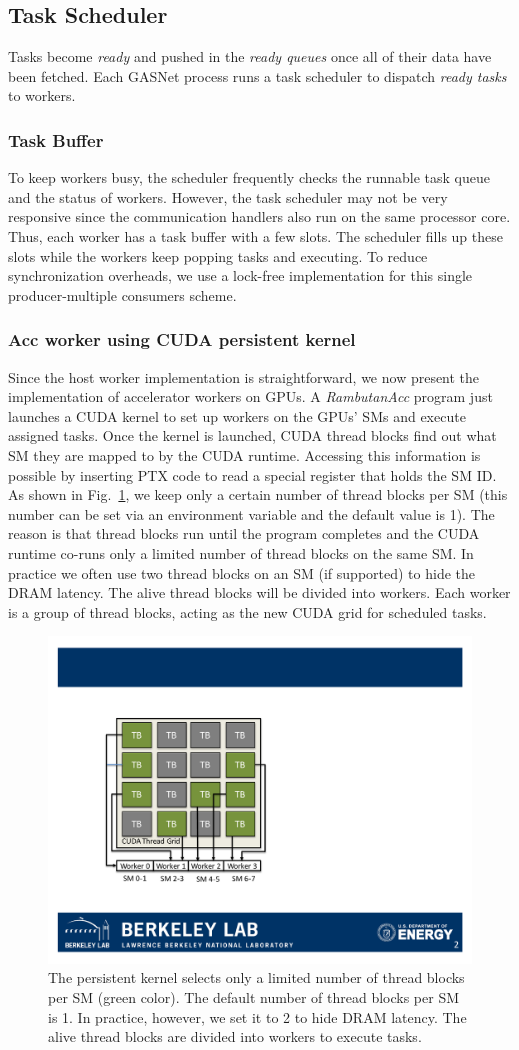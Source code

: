 \subsection{Task Scheduler}
Tasks become {\em ready} and pushed in the {\em ready queues} once all of their data have been fetched.
Each GASNet process runs a task scheduler to dispatch {\em ready tasks} to workers. 

\subsubsection{Task Buffer}
To keep workers busy, the scheduler frequently checks the runnable task queue and the status of workers.
However, the task scheduler may not be very responsive since the communication handlers also run on the same processor core.
Thus, each worker has a task buffer with a few slots.
The scheduler fills up these slots while the workers keep popping tasks and executing.
To reduce synchronization overheads, we use a lock-free implementation for this single producer-multiple consumers scheme.

\subsubsection{Acc worker using CUDA persistent kernel}
Since the host worker implementation is straightforward, we now present the implementation of accelerator workers on GPUs.
A {\em RambutanAcc} program just launches a CUDA kernel to set up workers on the GPUs' SMs and execute assigned tasks.
Once the kernel is launched, CUDA thread blocks find out what SM they are mapped to by the CUDA runtime.
Accessing this information is possible by inserting PTX code to read a special register that holds the SM ID.
As shown in Fig.~\ref{fig:kernel}, we keep only a certain number of thread blocks per SM (this number can be set via an environment variable and the default value is 1).
The reason is that thread blocks run until the program completes and the CUDA runtime co-runs only a limited number of thread blocks on the same SM.
In practice we often use two thread blocks on an SM (if supported) to hide the DRAM latency.
The alive thread blocks will be divided into workers.
Each worker is a group of thread blocks, acting as the new CUDA grid for scheduled tasks.

\begin{figure}[htb]
\centering
\includegraphics[width=.35\textwidth]{figures/kernel_init.pdf}
\caption{The persistent kernel selects only a limited number of thread blocks per SM (green color). The default number of thread blocks per SM is 1. 
In practice, however, we set it to 2 to hide DRAM latency.
The alive thread blocks are divided into workers to execute tasks.}
\label{fig:kernel}
\end{figure}

